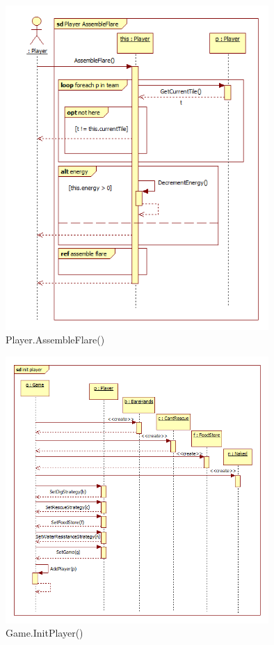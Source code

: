 \begin{figure}[H]
	\begin{center}
		\includegraphics[width=10cm]{chapters/chapter03/seqdiag/Player_AssembleFlare.png}
		\caption{Player.AssembleFlare()}
		\label{fig:PlayerAssembleFlare}
	\end{center}
\end{figure}
\begin{figure}[H]
	\begin{center}
		\includegraphics[width=10cm]{chapters/chapter03/seqdiag/Game_init_player.png}
		\caption{Game.InitPlayer()}
		\label{fig:GameInitPlayer}
	\end{center}
\end{figure}
